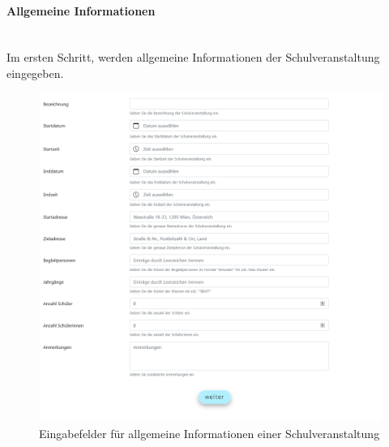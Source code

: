 \paragraph{Allgemeine Informationen}~\\
Im ersten Schritt, werden allgemeine Informationen der Schulveranstaltung eingegeben.
\begin{figure}[H]
	\centering
	\includegraphics[width=1\linewidth]{images/schoolgeneral}
	\caption[Schulveranstaltung]{Eingabefelder für allgemeine Informationen einer Schulveranstaltung}
	\label{fig:schoolgeneral}
\end{figure}
